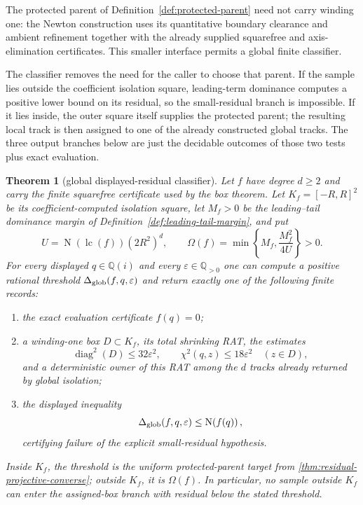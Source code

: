 \documentclass[11pt]{article}
\newtheorem{theorem}{Theorem}[section]
\newcommand{\Qi}{\mathbb{Q}(i)}
\newcommand{\Q}{\mathbb{Q}}
\newcommand{\Norm}[1]{\operatorname{N}\!\left(#1\right)}
\newcommand{\diamq}{\operatorname{diag}^{2}}
\newcommand{\eps}{\varepsilon}
\newcommand{\Defref}[1]{Definition~\ref{#1}}
\begin{document}
The protected parent of \Defref{def:protected-parent} need not carry winding
one: the Newton construction uses its quantitative boundary clearance and
ambient refinement together with the already supplied squarefree and
axis-elimination certificates.  This smaller interface permits a global
finite classifier.

The classifier removes the need for the caller to choose that parent.  If the
sample lies outside the coefficient isolation square, leading-term dominance
computes a positive lower bound on its residual, so the small-residual branch
is impossible.  If it lies inside, the outer square itself supplies the
protected parent; the resulting local track is then assigned to one of the
already constructed global tracks.  The three output branches below are just
the decidable outcomes of those two tests plus exact evaluation.

\begin{theorem}[global displayed-residual classifier]
\label{thm:global-residual-classifier}
Let $f$ have degree $d\ge2$ and carry the finite squarefree certificate used
by the box theorem.  Let $K_f=[-R,R]^2$ be its coefficient-computed
isolation square, let $M_f>0$ be the leading--tail dominance margin of
\Defref{def:leading-tail-margin}, and put
\[
 U=\Norm{\operatorname{lc}(f)}(2R^2)^d,
 \qquad
 \Omega(f)=\min\left\{M_f,\frac{M_f^2}{4U}\right\}>0.
\]
For every displayed $q\in\Qi$ and every $\eps\in\Q_{>0}$ one can compute a
positive rational threshold $\Delta_{\rm glob}(f,q,\eps)$ and return exactly
one of the following finite records:
\begin{enumerate}
\item the exact evaluation certificate $f(q)=0$;
\item a winding-one box $D\subset K_f$, its total shrinking RAT, the estimates
\[
 \diamq(D)\le32\eps^2,
 \qquad
 \chi^2(q,z)\le18\eps^2\quad(z\in D),
\]
and a deterministic owner of this RAT among the $d$ tracks already returned
by global isolation;
\item the displayed inequality
\[
             \Delta_{\rm glob}(f,q,\eps)\le\Norm{f(q)},
\]
certifying failure of the explicit small-residual hypothesis.
\end{enumerate}
Inside $K_f$, the threshold is the uniform protected-parent target from
\cref{thm:residual-projective-converse}; outside $K_f$, it is $\Omega(f)$.  In
particular, no sample outside $K_f$ can enter the assigned-box branch with
residual below the stated threshold.
\end{theorem}
\end{document}
